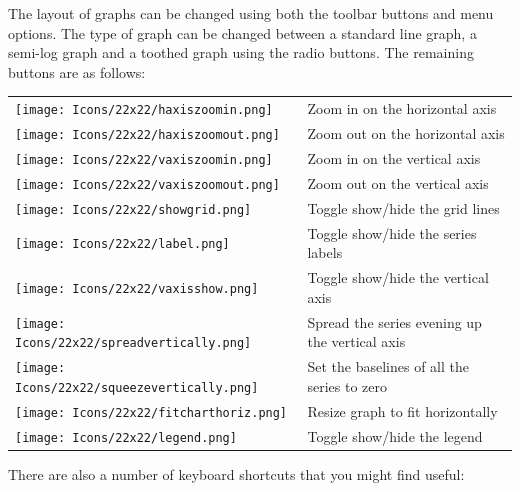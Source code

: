 The layout of graphs can be changed using both the toolbar buttons and menu options.  The type of graph can be changed between a standard line graph, a semi-log graph and a toothed graph using the radio buttons.  The remaining buttons are as follows:

\begin{center}
\begin{tabular*}{0.8\textwidth}[h]{lp{10cm}}
 \texttt{[image: Icons/22x22/haxiszoomin.png]} & Zoom in on the horizontal axis \\
 \texttt{[image: Icons/22x22/haxiszoomout.png]} & Zoom out on the horizontal axis \\
 \texttt{[image: Icons/22x22/vaxiszoomin.png]} & Zoom in on the vertical axis \\
 \texttt{[image: Icons/22x22/vaxiszoomout.png]} & Zoom out on the vertical axis \\
 \texttt{[image: Icons/22x22/showgrid.png]} & Toggle show/hide the grid lines \\
 \texttt{[image: Icons/22x22/label.png]} & Toggle show/hide the series labels \\
 \texttt{[image: Icons/22x22/vaxisshow.png]} & Toggle show/hide the vertical axis \\
 \texttt{[image: Icons/22x22/spreadvertically.png]} & Spread the series evening up the vertical axis \\
 \texttt{[image: Icons/22x22/squeezevertically.png]} & Set the baselines of all the series to zero \\
 \texttt{[image: Icons/22x22/fitcharthoriz.png]} & Resize graph to fit horizontally \\
 \texttt{[image: Icons/22x22/legend.png]} & Toggle show/hide the legend\\
\end{tabular*}
\end{center}

There are also a number of keyboard shortcuts that you might find useful:

